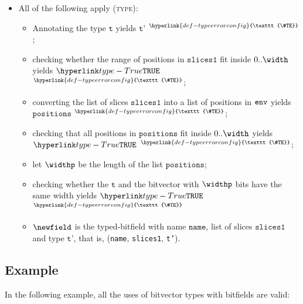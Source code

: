 \documentclass{book}
\newcommand\TypeErrorConfig[0]{\hyperlink{def-typeerrorconfig}{\texttt{\#TE}}}
\newcommand\ProseOrTypeError[0]{\hyperlink{def-proseortypeerror}{$^{\TypeErrorConfig}$}}
\newcommand\vt[0]{\texttt{t}}
\newcommand\slicesone[0]{\texttt{slices1}}
\newcommand\positions[0]{\texttt{positions}}
\newcommand\vtp[0]{\texttt{t'}}
\newcommand\name[0]{\texttt{name}}
\begin{document}
\begin{itemize}
\begin{itemize}
    \item All of the following apply (\textsc{type}):
    \begin{itemize}
      \item Annotating the type $\vt$ yields $\vtp$ \ProseOrTypeError;
      \item checking whether the range of positions in $\slicesone$ fit inside $0..\width$ yields $\True$ \ProseOrTypeError;
      \item converting the list of slices $\slicesone$ into a list of positions in $\texttt{env}$ yields $\positions$ \ProseOrTypeError;
      \item checking that all positions in $\positions$ fit inside $0..\width$ yields $\True$ \ProseOrTypeError;
      \item let $\widthp$ be the length of the list $\positions$;
      \item checking whether the $\vt$ and the bitvector with $\widthp$ bits have the same width yields $\True$ \ProseOrTypeError
      \item $\newfield$ is the typed-bitfield with name $\name$, list of slices $\slicesone$ and type $\vtp$, that is, \BitFieldType(\name, \slicesone, \vtp).
    \end{itemize}
  \end{itemize}
\end{itemize}

\subsection{Example}
In the following example, all the uses of bitvector types with bitfields are valid:

\end{document}
